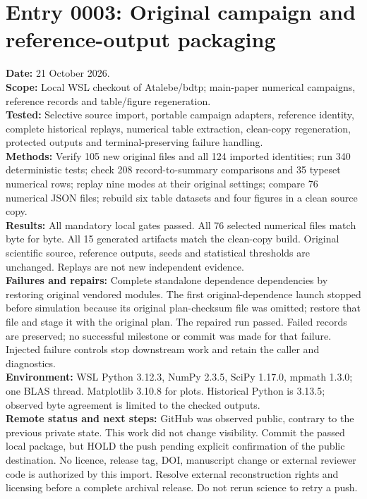 \section*{Entry 0003: Original campaign and reference-output packaging}
\textbf{Date:} 21 October 2026.\\
\textbf{Scope:} Local WSL checkout of Atalebe/bdtp; main-paper numerical
campaigns, reference records and table/figure regeneration.\\
\textbf{Tested:} Selective source import, portable campaign adapters, reference
identity, complete historical replays, numerical table extraction, clean-copy
regeneration, protected outputs and terminal-preserving failure handling.\\
\textbf{Methods:} Verify 105 new original files and all 124 imported identities;
run 340 deterministic tests; check 208 record-to-summary comparisons and 35 typeset
numerical rows; replay nine modes at their original settings; compare 76 numerical
JSON files; rebuild six table datasets and four figures in a clean source copy.\\
\textbf{Results:} All mandatory local gates passed. All 76 selected numerical
files match byte for byte. All 15 generated artifacts match the clean-copy build.
Original scientific source, reference outputs, seeds and statistical thresholds
are unchanged. Replays are not new independent evidence.\\
\textbf{Failures and repairs:} Complete standalone dependence dependencies by
restoring original vendored modules. The first original-dependence launch stopped
before simulation because its original plan-checksum file was omitted; restore
that file and stage it with the original plan. The repaired run passed. Failed
records are preserved; no successful milestone or commit was made for that failure.
Injected failure controls stop downstream work and retain the caller and diagnostics.\\
\textbf{Environment:} WSL Python 3.12.3, NumPy 2.3.5, SciPy 1.17.0, mpmath 1.3.0;
one BLAS thread. Matplotlib 3.10.8 for plots. Historical Python is 3.13.5; observed
byte agreement is limited to the checked outputs.\\
\textbf{Remote status and next steps:} GitHub was observed public, contrary to
the previous private state. This work did not change visibility. Commit the passed
local package, but HOLD the push pending explicit confirmation of the public
destination. No licence, release tag, DOI, manuscript change or external reviewer
code is authorized by this import. Resolve external reconstruction rights and
licensing before a complete archival release. Do not rerun science to retry a push.
